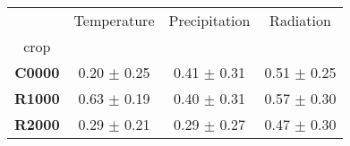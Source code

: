 \begin{tabular}{|c|c|c|c|}
\toprule
 & Temperature & Precipitation & Radiation \\
crop &  &  &  \\
\midrule
\textbf{C0000} & 0.20 $\pm$ 0.25 & 0.41 $\pm$ 0.31 & 0.51 $\pm$ 0.25 \\
\textbf{R1000} & 0.63 $\pm$ 0.19 & 0.40 $\pm$ 0.31 & 0.57 $\pm$ 0.30 \\
\textbf{R2000} & 0.29 $\pm$ 0.21 & 0.29 $\pm$ 0.27 & 0.47 $\pm$ 0.30 \\
\bottomrule
\end{tabular}
